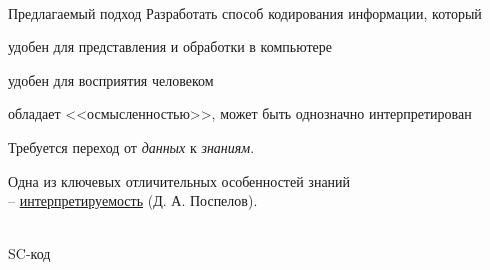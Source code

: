 \begin{frame}{\\Предлагаемый подход}
	\topline
	\justifying
	\large
	Разработать способ кодирования информации, который
	
	\begin{textitemize}
		\item удобен для представления и обработки в компьютере
		\item удобен для восприятия человеком
		\item обладает <<осмысленностью>>, может быть однозначно интерпретирован		
	\end{textitemize}

	\bigskip
	Требуется переход от \textit{данных} к \textit{знаниям}.

	\bigskip
	Одна из ключевых отличительных особенностей знаний\\ -- \uline{интерпретируемость} (Д. А. Поспелов).

\end{frame}

\begin{frame}{\\SC-код}
	\topline
	\justifying
	\begin{SCn}
	\end{SCn}
\end{frame}

